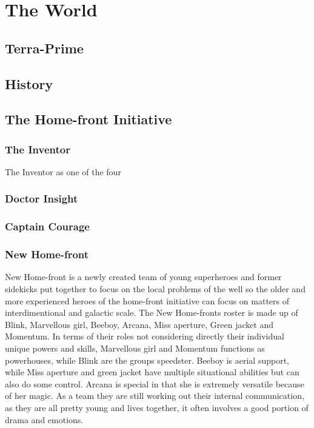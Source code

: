 \part{The World}
\chapter{Terra-Prime}

\chapter{History}

\chapter{The Home-front Initiative}
\section{The Inventor}
The Inventor as one of the four 
\section{Doctor Insight}
\section{Captain Courage}
\section{New Home-front}
New Home-front is a newly created team of young superheroes and former sidekicks put together to focus on the local problems of the well so the older and more experienced heroes of the home-front initiative can focus on matters of interdimentional and galactic scale. The New Home-fronts roster is made up of Blink, Marvellous girl, Beeboy, Arcana, Miss aperture, Green jacket and Momentum. In terms of their roles not considering directly their individual unique powers and skills, Marvellous girl and Momentum functions as powerhouses, while Blink are the groups speedster. Beeboy is aerial support, while Miss aperture and green jacket have multiple situational abilities but can also do some control. Arcana is special in that she is extremely versatile because of her magic.
As a team they are still working out their internal communication, as they are all pretty young and lives together, it often involves a good portion of drama and emotions.
